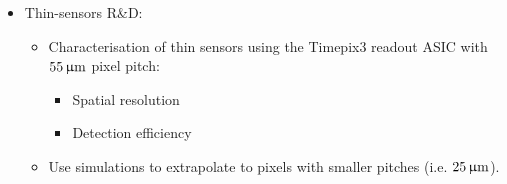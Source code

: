 \begin{frame}
\begin{columns}[t]
  \end{columns}


  \begin{columns}
    \vspace{-1cm}
    \begin{itemize}
    \item Thin-sensors R\&D:
      \begin{itemize}
      \item Characterisation of thin sensors using the Timepix3 readout
        ASIC with \textcolor{Blue}{$55\,\upmu\mathrm{m}$} pixel pitch:
        \begin{itemize}
        \item Spatial resolution
        \item Detection efficiency
        \end{itemize}
      \item Use simulations to extrapolate to pixels with smaller
        pitches (i.e. $25\,\upmu\mathrm{m}$).
      \end{itemize}
    \end{itemize}

  \centering
  \begin{adjustbox}{max totalsize={.9\textwidth}{.9\textheight},center}
  \end{adjustbox}
\end{columns}

\end{frame}


